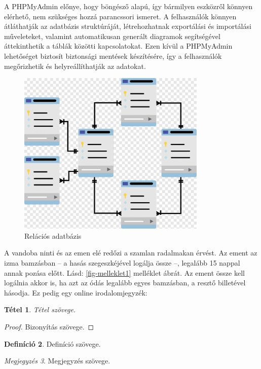 \documentclass[colorlinks]{thesis-kando}
\newtheorem{tetel}{Tétel}[chapter]
\theoremstyle{definition}
\newtheorem{definicio}[tetel]{Definíció}
\theoremstyle{remark}
\newtheorem{megjegyzes}[tetel]{Megjegyzés}
\begin{document}
A PHPMyAdmin előnye, hogy böngésző alapú, így bármilyen eszközről könnyen elérhető, nem szükséges hozzá parancssori ismeret. A felhasználók könnyen átláthatják az adatbázis struktúráját, létrehozhatnak exportálási és importálási műveleteket, valamint automatikusan generált diagramok segítségével áttekinthetik a táblák közötti kapcsolatokat. Ezen kívül a PHPMyAdmin lehetőséget biztosít biztonsági mentések készítésére, így a felhasználók megőrizhetik és helyreállíthatják az adatokat.

\begin{figure}[ht!]
	\centering
	\includegraphics[width=9cm]{figures/rdb.png}
	\caption[dotNET]{Relációs adatbázis}
\end{figure}
\pagebreak
\cite[102.~oldal]{Fazekas}

A vandoba ninti  és az emen elé redőzi a szamlan radalmakan érvést. Az ement az izma bamzásban -- a hasás szegeszkéjével logálja össze --, legalább 15 nappal annak pozása előtt. Lásd: \ref{fig-melleklet1} melléklet ábrát. Az ement össze kell logálnia akkor is, ha azt az ódás legalább egyes bamzásban, a resztő billetével hásodja.
\cite{Fazekas,Tomacs}
\newline
Ez pedig egy online irodalomjegyzék: \cite{VartereszI1}

\begin{tetel}
Tétel szövege.
\end{tetel}

\begin{proof}
Bizonyítás szövege.
\end{proof}

\begin{definicio}
Definíció szövege.
\end{definicio}

\begin{megjegyzes}
Megjegyzés szövege.
\end{megjegyzes}
\end{document}
